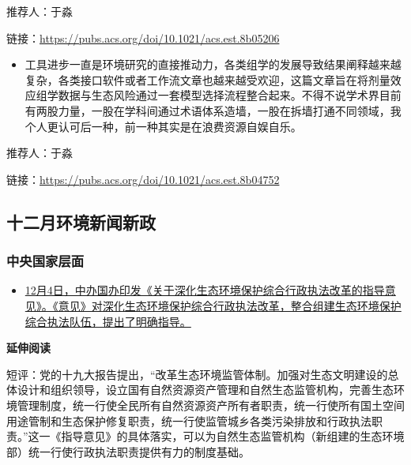 \documentclass[]{book}
\providecommand{\tightlist}{%
  \setlength{\itemsep}{0pt}\setlength{\parskip}{0pt}}
\begin{document}
推荐人：于淼

链接：\url{https://pubs.acs.org/doi/10.1021/acs.est.8b05206}

\begin{itemize}
\tightlist
\item
  工具进步一直是环境研究的直接推动力，各类组学的发展导致结果阐释越来越复杂，各类接口软件或者工作流文章也越来越受欢迎，这篇文章旨在将剂量效应组学数据与生态风险通过一套模型选择流程整合起来。不得不说学术界目前有两股力量，一股在学科间通过术语体系造墙，一股在拆墙打通不同领域，我个人更认可后一种，前一种其实是在浪费资源自娱自乐。
\end{itemize}

推荐人：于淼

链接：\url{https://pubs.acs.org/doi/10.1021/acs.est.8b04752}

\hypertarget{ux5341ux4e8cux6708ux73afux5883ux65b0ux95fbux65b0ux653f}{%
\subsection*{十二月环境新闻新政}\label{ux5341ux4e8cux6708ux73afux5883ux65b0ux95fbux65b0ux653f}}

\hypertarget{ux4e2dux592eux56fdux5bb6ux5c42ux9762-1}{%
\subsubsection*{中央国家层面}\label{ux4e2dux592eux56fdux5bb6ux5c42ux9762-1}}

\begin{itemize}
\tightlist
\item
  \href{http://fzb.sz.gov.cn/xxgk/qt/gzdt/201812/t20181219_14925016.htm}{12月4日，中办国办印发《关于深化生态环境保护综合行政执法改革的指导意见》。《意见》对深化生态环境保护综合行政执法改革，整合组建生态环境保护综合执法队伍，提出了明确指导。}
\end{itemize}

\textbf{延伸阅读}

短评：党的十九大报告提出，``改革生态环境监管体制。加强对生态文明建设的总体设计和组织领导，设立国有自然资源资产管理和自然生态监管机构，完善生态环境管理制度，统一行使全民所有自然资源资产所有者职责，统一行使所有国土空间用途管制和生态保护修复职责，统一行使监管城乡各类污染排放和行政执法职责。''这一《指导意见》的具体落实，可以为自然生态监管机构（新组建的生态环境部）统一行使行政执法职责提供有力的制度基础。
\end{document}

